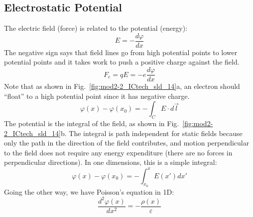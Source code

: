 \subsection{Electrostatic Potential}
The electric field (force) is related to the potential (energy):
\begin{equation} 
	E =  - \frac{{d\varphi }}{{dx}} 
\end{equation}
The negative sign says that field lines go from high potential points to lower potential points and it takes work to push a positive charge against the field.
\begin{equation} 
	{F_e} = qE =  - e\frac{{d\varphi }}{{dx}} 
\end{equation}
Note that as shown in Fig.~\ref{fig:mod2-2_ICtech_sld_14}a, an electron should “float” to a high potential point since it has negative charge.   
\begin{equation} 
	\varphi (x) - \varphi ({x_0}) =  - \int_C {E \cdot d\vec l} 
\end{equation}
The potential is the integral of the field, as shown in Fig.~\ref{fig:mod2-2_ICtech_sld_14}b.  The integral is path independent for static fields because only the path in the direction of the field contributes, and motion perpendicular to the field does not require any energy expenditure (there are no forces in perpendicular directions).    In one dimensions, this is a simple integral:
\begin{equation} 
	\varphi (x) - \varphi ({x_0}) =  - \int_{{x_0}}^x {E(x')dx'}  
\end{equation}
Going the other way, we have Poisson’s equation in 1D:
\begin{equation} 
	\frac{{{d^2}\varphi (x)}}{{d{x^2}}} =  - \frac{{\rho (x)}}{\varepsilon }
\end{equation}
